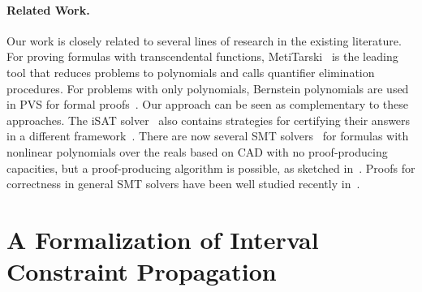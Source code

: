 \documentclass{llncs}
\begin{document}
\paragraph{Related Work.} Our work is closely related to several lines
of research in the existing literature. For proving formulas with
transcendental functions,
MetiTarski~\cite{DBLP:conf/itp/Paulson12,DBLP:journals/jar/AkbarpourP10,DBLP:conf/aisc/PassmorePM12}
is the leading tool that reduces problems to
polynomials and calls quantifier elimination procedures. For problems with only
polynomials, Bernstein polynomials are used in PVS for formal
proofs~\cite{MN12}. Our approach can be seen as complementary to these
approaches. The iSAT solver~\cite{HySAT} also contains strategies for certifying
their answers in a different framework~\cite{DBLP:conf/ddecs/KupferschmidBTF11}.
There are now several SMT
solvers~\cite{DBLP:conf/cade/JovanovicM12,DBLP:conf/mkm/PassmoreJ09} for formulas with nonlinear polynomials over
the reals based on CAD with no proof-producing capacities, but a proof-producing
algorithm is possible, as sketched in~\cite{DBLP:conf/cade/McLaughlinH05}. Proofs for
correctness in general SMT solvers have been well studied
 recently in~\cite{DBLP:journals/fmsd/StumpORHT13}.

\section{A Formalization of Interval Constraint Propagation}\label{formalization}
\end{document}
